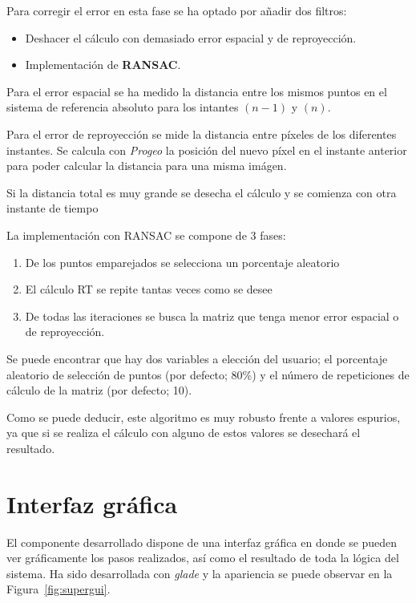 Para corregir el error en esta fase se ha optado por añadir dos filtros:

\begin{itemize}
\item Deshacer el cálculo con demasiado error espacial y de reproyección.
\item Implementación de \textbf{RANSAC}.
\end{itemize}

Para el error espacial se ha medido la distancia entre los mismos puntos en el sistema de referencia absoluto para los intantes $(n-1)$ y $(n)$. 

Para el error de reproyección se mide la distancia entre píxeles de los diferentes instantes. Se calcula con \textit{Progeo} la posición del nuevo píxel en el instante anterior para poder calcular la distancia para una misma imágen.

Si la distancia total es muy grande se desecha el cálculo y se comienza con otra instante de tiempo

La implementación con RANSAC se compone de 3 fases:

\begin{enumerate}
\item De los puntos emparejados se selecciona un porcentaje aleatorio
\item El cálculo RT se repite tantas veces como se desee
\item De todas las iteraciones se busca la matriz que tenga menor error espacial o de reproyección.
\end{enumerate}

Se puede encontrar que hay dos variables a elección del usuario; el porcentaje aleatorio de selección de puntos (por defecto; 80\%) y el número de repeticiones de cálculo de la matriz (por defecto; 10).

Como se puede deducir, este algoritmo es muy robusto frente a valores espurios, ya que si se realiza el cálculo con alguno de estos valores se desechará el resultado.


\section{Interfaz gráfica}

El componente desarrollado dispone de una interfaz gráfica en donde se pueden ver gráficamente los pasos realizados, así como el resultado de toda la lógica del sistema. Ha sido desarrollada con \textit{glade} y la apariencia se puede observar en la Figura~\ref{fig:supergui}.

